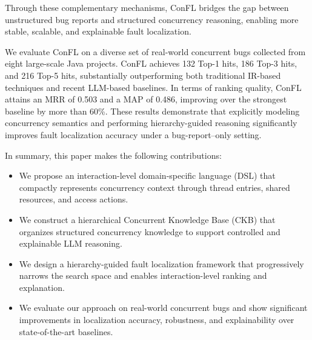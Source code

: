 Through these complementary mechanisms, ConFL bridges the gap between unstructured bug reports and structured concurrency reasoning, enabling more stable, scalable, and explainable fault localization.

We evaluate ConFL on a diverse set of real-world concurrent bugs collected from eight large-scale Java projects.
ConFL achieves 132 Top-1 hits, 186 Top-3 hits, and 216 Top-5 hits, substantially outperforming both traditional IR-based techniques and recent LLM-based baselines.
In terms of ranking quality, ConFL attains an MRR of 0.503 and a MAP of 0.486, improving over the strongest baseline by more than 60\%.
These results demonstrate that explicitly modeling concurrency semantics and performing hierarchy-guided reasoning significantly improves fault localization accuracy under a bug-report–only setting.

In summary, this paper makes the following contributions:
\begin{itemize}
    \item We propose an interaction-level domain-specific language (DSL) that compactly represents concurrency context through thread entries, shared resources, and access actions.
    
    \item We construct a hierarchical Concurrent Knowledge Base (CKB) that organizes structured concurrency knowledge to support controlled and explainable LLM reasoning.
    
    \item We design a hierarchy-guided fault localization framework that progressively narrows the search space and enables interaction-level ranking and explanation.
    
    \item We evaluate our approach on real-world concurrent bugs and show significant improvements in localization accuracy, robustness, and explainability over state-of-the-art baselines.
\end{itemize}